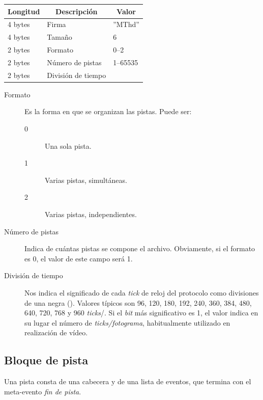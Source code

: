 \begin{center}
	\begin{tabular}{|l|l|l|}
		\hline \multicolumn{1}{|c|}{\textbf{Longitud}} & \multicolumn{1}{c|}{\textbf{Descripción}} & \multicolumn{1}{c|}{\textbf{Valor}} \\
		\hline 4 bytes & Firma & ''MThd'' \\ 
		\hline 4 bytes & Tamaño & 6 \\ 
		\hline 2 bytes & Formato & 0--2 \\ 
		\hline 2 bytes & Número de pistas & 1--65535 \\ 
		\hline 2 bytes & División de tiempo &  \\ 
		\hline 
	\end{tabular}
	\smallskip
\end{center}

\smallskip

\begin{description}
	\item[Formato] Es la forma en que se organizan las pistas. Puede ser:
	\begin{description}
		\item[0] Una sola pista.
		\item[1] Varias pistas, simultáneas.
		\item[2] Varias pistas, independientes.
	\end{description}
	
	\item[Número de pistas] Indica de cuántas pistas se compone el archivo. Obviamente, si el formato es 0, el valor de este campo será 1.
	
	\item[División de tiempo] Nos indica el significado de cada \textit{tick} de reloj del protocolo como divisiones de una negra (\quarternote). Valores típicos son 96, 120, 180, 192, 240, 360, 384, 480, 640, 720, 768 y 960 \textit{ticks}/\quarternote. Si el \textit{bit} más significativo es 1, el valor indica en su lugar el número de \textit{ticks/fotograma}, habitualmente utilizado en realización de vídeo.
\end{description}

\subsection{Bloque de pista}

Una pista consta de una cabecera y de una lista de eventos, que termina con el meta-evento \textit{fin de pista}.

